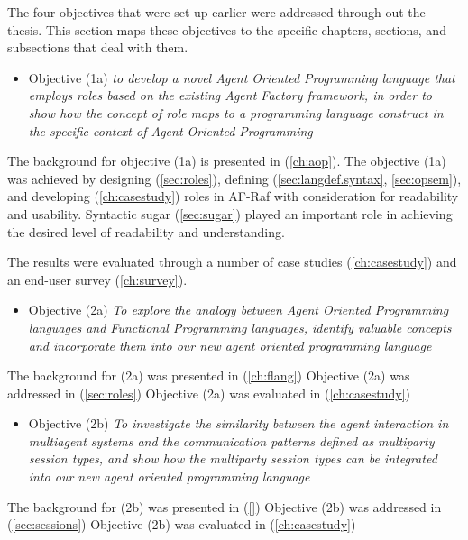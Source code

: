 \documentclass[a4paper,12pt,oneside,fleqn]{book} %
\begin{document}
The four objectives that were set up earlier were addressed through out the
thesis. This section maps these objectives to the specific chapters,
sections, and subsections that deal with them.

\begin{itemize}
  \item Objective (1a) \textit{to develop a novel Agent Oriented Programming language that employs roles based on the existing Agent Factory framework, in order to show how the concept of role maps to a programming language construct in the specific context of Agent Oriented Programming} 
\end{itemize}

The background for objective (1a) is presented in (\autoref{ch:aop}).
The objective (1a) was achieved by designing (\autoref{sec:roles}),
defining (\autoref{sec:langdef.syntax}, \autoref{sec:opsem}), and
developing (\autoref{ch:casestudy}) roles in AF-Raf with consideration for
readability and usability. Syntactic sugar (\autoref{sec:sugar}) played an
important role in achieving the desired level of readability and
understanding.

The results were evaluated through a number of case studies
(\autoref{ch:casestudy}) and an end-user survey (\autoref{ch:survey}).


\begin{itemize}
  \item Objective (2a) \textit{To explore the analogy between Agent
    Oriented Programming languages and Functional Programming languages,
    identify valuable concepts and incorporate them into our new agent
  oriented programming language}
\end{itemize}

The background for (2a) was presented in (\autoref{ch:flang})
Objective (2a) was addressed in (\autoref{sec:roles})
Objective (2a) was  evaluated in (\autoref{ch:casestudy})

\begin{itemize}
\item Objective (2b) \textit{To investigate the similarity between
    the agent interaction in multiagent systems and the communication
    patterns defined as multiparty session types, and show how the
    multiparty session types can be integrated into our new agent oriented
  programming language}
\end{itemize}
  
The background for (2b) was presented in (\autoref{})
Objective (2b) was addressed in (\autoref{sec:sessions})
Objective (2b) was  evaluated in (\autoref{ch:casestudy})
\end{document}

